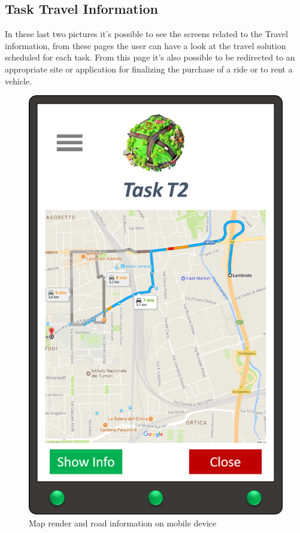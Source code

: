 \subsection*{Task Travel Information}
In these last two pictures it's possible to see the screens related to the Travel information, from these pages the user can have a look at the travel solution scheduled for each task. From this page it's also possible to be redirected to an appropriate site or application for finalizing the purchase of a ride or to rent a vehicle.   

\begin{figure}[H]
    \centering
    \includegraphics[scale=0.3]{Pictures/Mockups/AppMap.png}
    \caption{Map render and road information on mobile device}
\end{figure}


